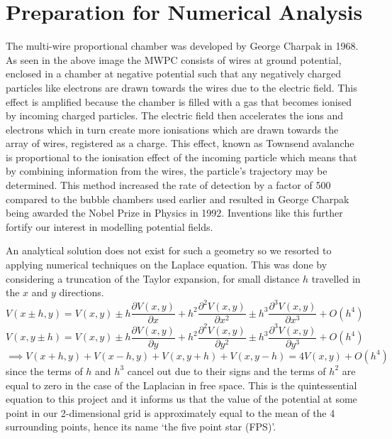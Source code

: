 \documentclass[a4paper]{article}
\begin{document}
\section{Preparation for Numerical Analysis}
The multi-wire proportional chamber was developed by George Charpak in 1968. As 
seen in the above image the MWPC consists of wires at ground potential, 
enclosed in a chamber at negative potential such that any negatively charged 
particles like electrons are drawn towards the wires due to the electric field. 
This effect is amplified because the chamber is filled with a gas that becomes 
ionised by incoming charged particles. The electric field then accelerates the 
ions and electrons which in turn create more ionisations which are drawn 
towards the array of wires, registered as a charge. This effect, known as 
Townsend avalanche is proportional to the ionisation effect of the incoming 
particle which means that by combining information from the wires, the 
particle's trajectory may be determined. This method increased the rate of 
detection by a factor of 500 compared to the bubble chambers used earlier and 
resulted in George Charpak being awarded the Nobel Prize in Physics in 1992. 
Inventions like this further fortify our interest in modelling potential 
fields.

An analytical solution does not exist for such a geometry so we resorted to 
applying numerical techniques on the Laplace equation. This was done by 
considering a truncation of the Taylor expansion, for small distance $h$ travelled 
in the $x$ and $y$ directions.
\begin{equation}V(x\pm h,y) = V(x,y)\pm h\frac{\partial V(x,y)}{\partial x} + 
h^2 \frac{\partial^2V(x,y)}{\partial x^2} \pm h^3 
\frac{\partial^3V(x,y)}{\partial x^3}+ O(h^4) \end{equation}
\begin{equation} V(x,y\pm h) = V(x,y)\pm h\frac{\partial V(x,y)}{\partial y} + 
h^2 \frac{\partial^2V(x,y)}{\partial y^2} \pm h^3 
\frac{\partial^3V(x,y)}{\partial y^3} + O(h^4) \end{equation}
\begin{equation} \label{FPS} \implies V(x+h,y)+V(x-h,y)+V(x,y+h)+V(x,y-h) = 
4V(x,y)+O(h^4)\end{equation}
since the terms of $h$ and $h^3$ cancel out due to their signs and the terms of 
$h^2$ are equal to zero in the case of the Laplacian in free space. This is the 
quintessential equation to this project and it informs us that the value of the 
potential at some point in our 2-dimensional grid is approximately equal to the 
mean of the 4 surrounding points, hence its name `the five point star (FPS)'.\\
\end{document}
